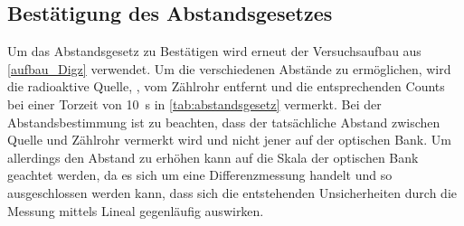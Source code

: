 \documentclass[12pt,english,ngerman]{scrartcl}
\begin{document}
\begin{table}[H]
	\caption[Erhaltene Counts für die Zählstatistik]{Tabelle in der, der Besseren Übersicht halber, ein Ausschnitt der erhaltenen Counts für die Zählstatistik
		für eine Torzeit von \SI{1}{\second} aufgelistet sind. Dabei sind die Counts sind exakt. \\
		\(t \dots\) entsprechende Zeit, die den Memory Speicher übergeben wird,
		in s, dabei werden die Werte der besseren Lesbarkeit halber nur auf eine
		Nachkommastelle genau angegeben. Dennoch sei hier zu bemerken, dass die
		Unsicherheit im Nanosekunden-Bereich liegt und in der Auswertung berücksichtigt
		worden ist. \\
		\(n \dots\) verzeichnete Anzahl an Counts}\label{tab:zahlstatistik}
	\begin{center}
		
	\end{center}
\end{table}

\subsection{Bestätigung des Abstandsgesetzes}

Um das Abstandsgesetz zu Bestätigen wird erneut der Versuchsaufbau aus
\autoref{aufbau_Digz} verwendet. Um die verschiedenen Abstände zu ermöglichen,
wird die radioaktive Quelle, , vom Zählrohr entfernt und die
entsprechenden Counts bei einer Torzeit von \SI{10}{\second} in
\autoref{tab:abstandsgesetz} vermerkt. Bei der Abstandsbestimmung ist zu
beachten, dass der tatsächliche Abstand zwischen Quelle und Zählrohr vermerkt
wird und nicht jener auf der optischen Bank. Um allerdings den Abstand zu
erhöhen kann auf die Skala der optischen Bank geachtet werden, da es sich um
eine Differenzmessung handelt und so ausgeschlossen werden kann, dass sich die
entstehenden Unsicherheiten durch die Messung mittels Lineal gegenläufig
auswirken.

\begin{table}[H]
	\caption[Erhaltene Zählraten bei unterschiedlichen Abständen der
		Quelle]{Erhaltene Zählraten bei unterschiedlichen Abständen der Quelle bei
		einer Torzeit von \SI{10}{\second}. Dabei sind die Zählraten exakt\\
		\(l_{\mathrm{Quelle}} \dots\) Abstand der radioaktiven Quelle in cm mit einer Unsicherheit von \SI{0.2}{\cm}\\
		\(z_{i} \dots\) erhaltene Zählrate bei entsprechendem Abstand} \label{tab:abstandsgesetz}
	\begin{center}
		
	\end{center}
\end{table}
\end{document}
